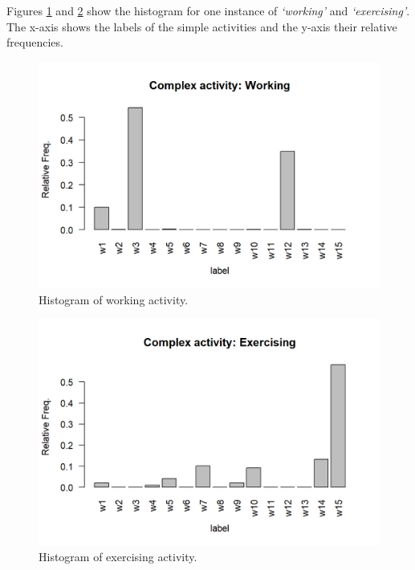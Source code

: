 \documentclass[
  11pt,
]{krantz}
\begin{document}
Figures \ref{fig:complexWorking} and \ref{fig:complexExercising} show the histogram for one instance of \emph{`working'} and \emph{`exercising'}. The x-axis shows the labels of the simple activities and the y-axis their relative frequencies.

\begin{figure}

{\centering \includegraphics[width=0.9\linewidth]{images/complex_working} 

}

\caption{Histogram of working activity.}\label{fig:complexWorking}
\end{figure}

\begin{figure}

{\centering \includegraphics[width=0.9\linewidth]{images/complex_exercising} 

}

\caption{Histogram of exercising activity.}\label{fig:complexExercising}
\end{figure}
\end{document}
